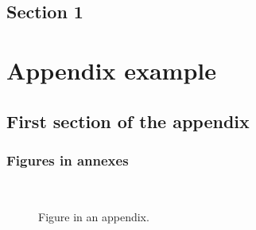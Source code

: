 \documentclass[letterpaper%
, twoside%
, 12pt%
,these%
, english%
,creativecommons,hyperref%
]{thETS}
\begin{document}
\section{Section 1}

\lipsum[1] %

\begin{conclusion}

\lipsum[1] %

\end{conclusion}


\appendix

\multiannexe

% 

\chapter{Appendix example}


\section{First section of the appendix}


\subsection{Figures in annexes}

\begin{figure}
	\centering
	 \\ \parbox{0.75\textwidth}{\caption{Figure in an appendix.}\label{fig:testAp}}
\end{figure}
\end{document}
